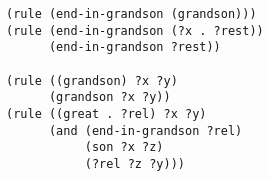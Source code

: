 \documentclass[a4paper,12pt]{article}
\begin{document}
\begin{lstlisting}
(rule (end-in-grandson (grandson)))
(rule (end-in-grandson (?x . ?rest))
      (end-in-grandson ?rest))

(rule ((grandson) ?x ?y)
      (grandson ?x ?y))
(rule ((great . ?rel) ?x ?y)
      (and (end-in-grandson ?rel)
           (son ?x ?z)
           (?rel ?z ?y)))
\end{lstlisting}
\end{document}
